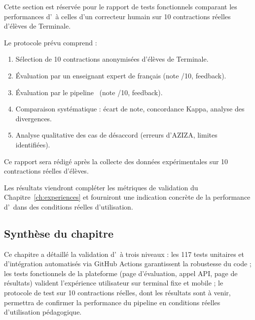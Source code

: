 Cette section est réservée pour le rapport de tests fonctionnels comparant les performances d'\AZIZA\ à celles d'un correcteur humain sur 10 contractions réelles d'élèves de Terminale.

Le protocole prévu comprend :

\begin{enumerate}
    \item Sélection de 10 contractions anonymisées d'élèves de Terminale.
    \item Évaluation par un enseignant expert de français (note /10, feedback).
    \item Évaluation par le pipeline \AZIZA\ (note /10, feedback).
    \item Comparaison systématique : écart de note, concordance Kappa, analyse des divergences.
    \item Analyse qualitative des cas de désaccord (erreurs d'AZIZA, limites identifiées).
\end{enumerate}

\vspace{1cm}
\begin{tcolorbox}[colback=yellow!10,colframe=orange!80,title=\textbf{À COMPLÉTER}]
Ce rapport sera rédigé après la collecte des données expérimentales sur 10 contractions réelles d'élèves.
\end{tcolorbox}
\vspace{1cm}

Les résultats viendront compléter les métriques de validation du Chapitre~\ref{ch:experiences} et fourniront une indication concrète de la performance d'\AZIZA\ dans des conditions réelles d'utilisation.

\subsection*{Synthèse du chapitre}

Ce chapitre a détaillé la validation d'\AZIZA\ à trois niveaux : les 117 tests unitaires et d'intégration automatisés via GitHub Actions garantissent la robustesse du code ; les tests fonctionnels de la plateforme (page d'évaluation, appel API, page de résultats) valident l'expérience utilisateur sur terminal fixe et mobile ; le protocole de test sur 10 contractions réelles, dont les résultats sont à venir, permettra de confirmer la performance du pipeline en conditions réelles d'utilisation pédagogique.
